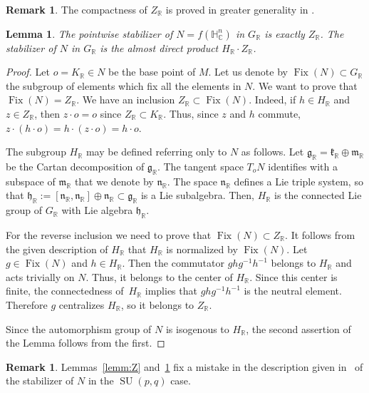 \documentclass[JEP,XML,SOM,Unicode,NoFloatCountersInSection]{cedram}
\newcommand{\citestar}[3]{\cite[#3]{#1}}
\theoremstyle{plain}
\newtheorem{lemm}[theo]{Lemma}
\theoremstyle{definition}
\newtheorem{rema}[theo]{Remark}
\DeclareMathOperator{\Fix}{Fix}
\DeclareMathOperator{\SU}{SU}
\newcommand{\bR}{\mathbb{R}}
\newcommand{\HC}{{\mathbb{H}^n_\mathbb{C}}}
\newcommand{\fgg}{\mathfrak{g}}
\newcommand{\fh}{\mathfrak{h}}
\newcommand{\fk}{\mathfrak{k}}
\newcommand{\fm}{\mathfrak{m}}
\newcommand{\fn}{\mathfrak{n}}
\begin{document}
\begin{rema}
\label{rema:compactness}
The compactness of $Z_\bR$ is proved in greater generality in \citestar{BIW}*{Cor.\,4}.
\end{rema}

\begin{lemm} \label{lemm:fixator}
The pointwise stabilizer of $N=f(\HC)$ in $G_\bR$ is exactly $Z_\bR$. The stabilizer of $N$ in $G_\bR$ is the
almost direct product $H_\bR\cdot Z_\bR$.
\end{lemm}
\begin{proof}
Let $o=K_\bR \in N$ be the base point of $M$.
Let us denote by $\Fix(N) \subset G_\bR$ the subgroup of elements which fix all the elements in $N$.
We want to prove that $\Fix(N)=Z_\bR$. We have an inclusion $Z_\bR \subset \Fix(N)$. Indeed, if $h \in H_\bR$ and
$z \in Z_\bR$, then $z\cdot o = o$ since $Z_\bR\subset K_\bR$. Thus, since $z$ and $h$ commute, $z
\cdot (h \cdot o) = h \cdot (z \cdot o) = h \cdot o$.

The subgroup $H_\bR$ may be defined referring only to $N$ as follows.
Let $\fgg_\bR = \fk_\bR \oplus \fm_\bR$ be the Cartan decomposition of $\fgg_\bR$. The tangent space
$T_oN$ identifies with a subspace of $\fm_\bR$ that we denote by $\fn_\bR$.
The space $\fn_\bR$ defines a Lie triple system, so that $\fh_\bR:= [\fn_\bR,\fn_\bR] \oplus \fn_\bR
\subset \fgg_\bR$ is a Lie subalgebra. Then, $H_\bR$ is the connected Lie group of $G_\bR$
with Lie algebra $\fh_\bR$.

For the reverse inclusion we need to prove that $\Fix(N) \subset Z_\bR$.
It follows from the given description of $H_\bR$ that $H_\bR$ is normalized by $\Fix(N)$.
Let $g \in \Fix(N)$ and $h \in H_\bR$. Then the commutator
$ghg^{-1}h^{-1}$ belongs to $H_\bR$ and acts trivially on $N$. Thus, it belongs to the center of
$H_\bR$. Since this center is finite, the connectedness of~$H_\bR$ implies that $ghg^{-1}h^{-1}$ is the neutral element. Therefore $g$ centralizes $H_\bR$, so
it belongs to $Z_\bR$.

Since the automorphism group of $N$ is isogenous to $H_\bR$, the second assertion of the Lemma
follows from the first.
\end{proof}

\begin{rema}
Lemmas~\ref{lemm:Z} and~\ref{lemm:fixator} fix a mistake in the description given
in~\citestar{KMrank2}*{.2} of the stabilizer of $N$ in the $\SU(p,q)$ case.
\end{rema}
\end{document}
